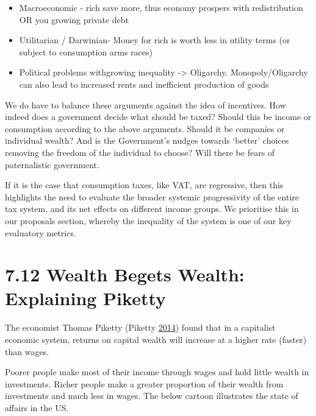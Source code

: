 \documentclass[]{tufte-handout}
\begin{document}
\begin{itemize}
\item
  Macroeconomic - rich save more, thus economy prospers with
  redistribution OR you growing private debt
\item
  Utilitarian / Darwinian- Money for rich is worth less in utility terms
  (or subject to consumption arms races)
\item
  Political problems withgrowing inequality -\textgreater{} Oligarchy.
  Monopoly/Oligarchy can also lead to increased rents and inefficient
  production of goods
\end{itemize}

We do have to balance these arguments against the idea of incentives.
How indeed does a government decide what should be taxed? Should this be
income or consumption according to the above arguments. Should it be
companies or individual wealth? And is the Government's nudges towards
`better' choices removing the freedom of the individual to choose? Will
there be fears of paternalistic government.

If it is the case that consumption taxes, like VAT, are regressive, then
this highlights the need to evaluate the broader systemic progressivity
of the entire tax system, and its net effects on different income
groups. We prioritise this in our proposals section, whereby the
inequality of the system is one of our key evaluatory metrics.

\hypertarget{wealth-begets-wealth-explaining-piketty}{%
\section{7.12 Wealth Begets Wealth: Explaining
Piketty}\label{wealth-begets-wealth-explaining-piketty}}

The economist Thomas Piketty (Piketty
\protect\hyperlink{ref-Piketty2014a}{2014}) found that in a capitalist
economic system, returns on capital wealth will increase at a higher
rate (faster) than wages.

Poorer people make most of their income through wages and hold little
wealth in investments. Richer people make a greater proportion of their
wealth from investments and much less in wages. The below cartoon
illustrates the state of affairs in the US.
\end{document}
